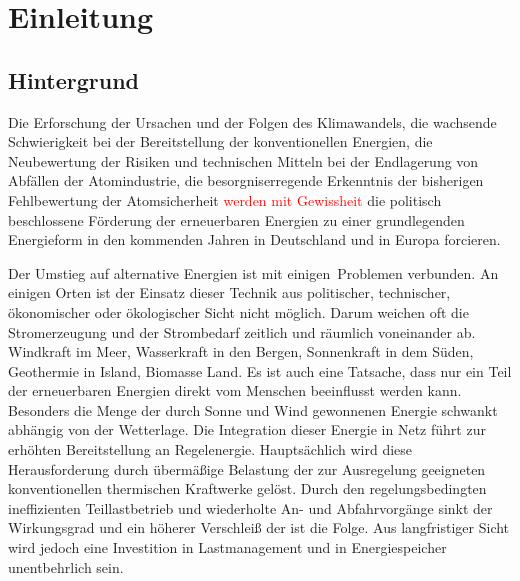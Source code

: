 \chapter{Einleitung}
\label{chap:einleitung}

%

\section*{Hintergrund}
Die Erforschung der Ursachen und der Folgen des Klimawandels, die wachsende Schwierigkeit bei der Bereitstellung der
konventionellen Energien, die Neubewertung der Risiken und technischen Mitteln bei der Endlagerung von Abfällen der
Atomindustrie, die besorgniserregende Erkenntnis der bisherigen Fehlbewertung der Atomsicherheit \textcolor{red}{werden mit
Gewissheit} die politisch beschlossene Förderung der erneuerbaren Energien zu einer grundlegenden Energieform in den
kommenden Jahren in Deutschland und in Europa forcieren.

Der Umstieg auf alternative Energien ist mit einigen$\,$ Problemen verbunden. An einigen Orten ist
der Einsatz dieser Technik aus politischer, technischer, ökonomischer oder ökologischer Sicht nicht möglich. Darum weichen
oft die Stromerzeugung und der Strombedarf zeitlich und räumlich voneinander ab. Windkraft im Meer, Wasserkraft in den
Bergen, Sonnenkraft in dem Süden, Geothermie in Island, Biomasse Land. Es ist auch
eine Tatsache, dass nur ein Teil der erneuerbaren Energien direkt vom Menschen beeinflusst werden kann. Besonders die Menge
der durch Sonne und Wind gewonnenen Energie schwankt abhängig von der Wetterlage. Die Integration dieser Energie in Netz
führt zur erhöhten Bereitstellung an Regelenergie. Hauptsächlich wird diese Herausforderung durch übermäßige Belastung der zur
Ausregelung geeigneten konventionellen thermischen Kraftwerke gelöst. Durch den regelungsbedingten ineffizienten
Teillastbetrieb und wiederholte An- und Abfahrvorgänge sinkt der Wirkungsgrad und ein höherer Verschleiß der ist die Folge.
Aus langfristiger Sicht wird jedoch eine Investition in Lastmanagement und in Energiespeicher unentbehrlich sein.
